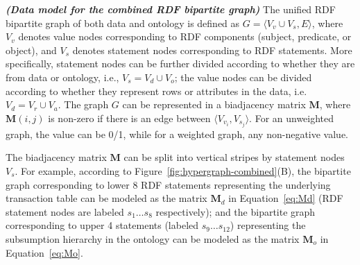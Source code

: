 %

\begin{mydef}
\emph{\textbf{(Data model for the combined RDF bipartite graph)}} The unified RDF bipartite graph of both data and ontology is defined as $G=\langle V_v \cup V_s, E \rangle$, where $V_v$ denotes value nodes corresponding to RDF components (subject, predicate, or object), and $V_s$ denotes statement nodes corresponding to RDF statements. More specifically, statement nodes can be further divided according to whether they are from data or ontology, i.e., $V_s=V_d \cup V_o$; the value nodes can be divided according to whether they represent rows or attributes in the data, i.e. $V_d=V_r \cup V_a$. The graph $G$ can be represented in a biadjacency matrix $\mathbf{M}$, where $\mathbf{M}(i,j)$ is non-zero if there is an edge between $\langle V_{v_i}, V_{s_j} \rangle$. For an unweighted graph, the value can be 0/1, while for a weighted graph, any non-negative value.
\end{mydef}

The biadjacency matrix $\mathbf{M}$ can be split into vertical stripes by statement nodes $V_s$. For example, according to Figure~\ref{fig:hypergraph-combined}(B), the bipartite graph corresponding to lower 8 RDF statements representing the underlying transaction table can be modeled as the matrix $\mathbf{M}_d$ in Equation~\ref{eq:Md} (RDF statement nodes are labeled $s_1\dots s_8$ respectively); and the bipartite graph corresponding to upper 4 statements (labeled $s_9\dots s_{12}$) representing the subsumption hierarchy in the ontology can be modeled as the matrix $\mathbf{M}_o$ in Equation~\ref{eq:Mo}.

